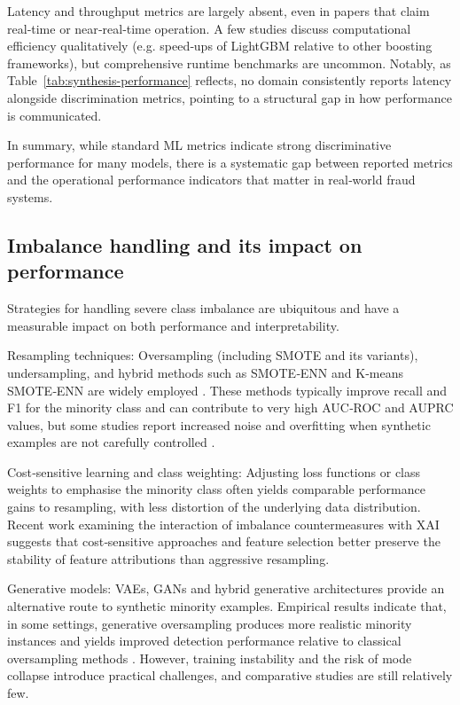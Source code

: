 \documentclass[a4paper,fleqn]{cas-dc}
\begin{document}
Latency and throughput metrics are largely absent, even in papers that claim real‑time or near‑real‑time operation. A few studies discuss computational efficiency qualitatively (e.g. speed‑ups of LightGBM relative to other boosting frameworks), but comprehensive runtime benchmarks are uncommon. Notably, as Table~\ref{tab:synthesis-performance} reflects, no domain consistently reports latency alongside discrimination metrics, pointing to a structural gap in how performance is communicated.

In summary, while standard ML metrics indicate strong discriminative performance for many models, there is a systematic gap between reported metrics and the operational performance indicators that matter in real‑world fraud systems.
\subsection{Imbalance handling and its impact on performance}
Strategies for handling severe class imbalance are ubiquitous and have a measurable impact on both performance and interpretability.

Resampling techniques: Oversampling (including SMOTE and its variants), undersampling, and hybrid methods such as SMOTE‑ENN and K‑means SMOTE‑ENN are widely employed \cite{lalit_imbalance_2025, li_uncovering_2024, ranganatha_enhancing_2025, ravindranath_evaluation_2024, de_zarza_optimizing_2023}. 
These methods typically improve recall and F1 for the minority class and can contribute to very high AUC‑ROC and AUPRC values, but some studies report increased noise and overfitting when synthetic examples are not carefully controlled \cite{al_balawi_credit-card_2023}. 

Cost‑sensitive learning and class weighting: Adjusting loss functions or class weights to emphasise the minority class often yields comparable performance gains to resampling, with less distortion of the underlying data distribution. Recent work examining the interaction of imbalance countermeasures with XAI suggests that cost‑sensitive approaches and feature selection better preserve the stability of feature attributions than aggressive resampling.

Generative models: VAEs, GANs and hybrid generative architectures provide an alternative route to synthetic minority examples. Empirical results indicate that, in some settings, generative oversampling produces more realistic minority instances and yields improved detection performance relative to classical oversampling methods \cite{de_zarza_optimizing_2023}. 
However, training instability and the risk of mode collapse introduce practical challenges, and comparative studies are still relatively few.
\end{document}
